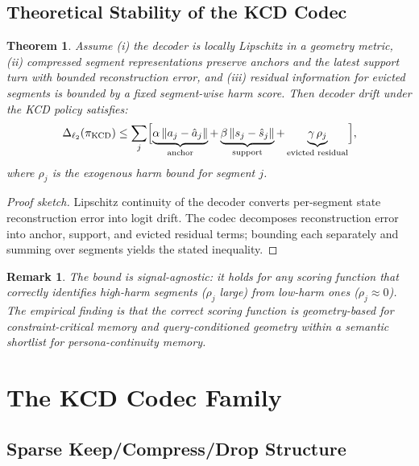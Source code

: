 \documentclass[conference]{IEEEtran}
\newtheorem{theorem}{Theorem}
\newtheorem{remark}{Remark}
\newcommand{\Logit}{\Delta_{\ell_2}}
\begin{document}
\subsection{Theoretical Stability of the KCD Codec}

\begin{theorem}
Assume (i) the decoder is locally Lipschitz in a geometry metric, (ii)
compressed segment representations preserve anchors and the latest support
turn with bounded reconstruction error, and (iii) residual information for
evicted segments is bounded by a fixed segment-wise harm score. Then decoder
drift under the KCD policy satisfies:
\begin{equation}
\Logit(\pi_{\mathrm{KCD}})
\leq
\sum_j \Bigl[
\underbrace{\alpha \,\lVert a_j - \hat{a}_j\rVert}_{\text{anchor}}
+ \underbrace{\beta \,\lVert s_j - \hat{s}_j\rVert}_{\text{support}}
+ \underbrace{\gamma \,\rho_j}_{\text{evicted residual}}
\Bigr],
\end{equation}
where $\rho_j$ is the exogenous harm bound for segment $j$.
\label{thm:stability}
\end{theorem}
\begin{proof}[Proof sketch]
Lipschitz continuity of the decoder converts per-segment state reconstruction
error into logit drift. The codec decomposes reconstruction error into anchor,
support, and evicted residual terms; bounding each separately and summing over
segments yields the stated inequality.
\end{proof}

\begin{remark}
The bound is signal-agnostic: it holds for any scoring function that correctly
identifies high-harm segments ($\rho_j$ large) from low-harm ones ($\rho_j
\approx 0$). The empirical finding is that the correct scoring function is
geometry-based for constraint-critical memory and query-conditioned geometry
within a semantic shortlist for persona-continuity memory.
\end{remark}

\section{The KCD Codec Family}
\label{sec:codec}

\subsection{Sparse Keep/Compress/Drop Structure}
\end{document}
